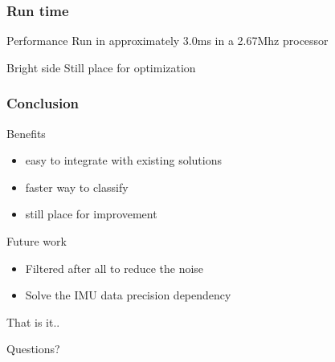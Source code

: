 \documentclass{beamer}
\begin{document}
	\begin{frame}
		\frametitle{Run time}

		\begin{alertblock}{Performance}
			Run in approximately 3.0ms in a 2.67Mhz processor
		\end{alertblock}		
		
		\begin{exampleblock}{Bright side}
			Still place for optimization
		\end{exampleblock}				
		
	\end{frame}	

	\begin{frame}
		\frametitle{Conclusion}
		
		\begin{block}{Benefits}
			\begin{itemize}
			\item easy to integrate with existing solutions
			\item faster way to classify
			\item still place for improvement
			\end{itemize}
		\end{block}		
		
		\begin{block}{Future work}
			\begin{itemize}
			\item Filtered after all to reduce the noise
			\item Solve the IMU data precision dependency
			\end{itemize}
		\end{block}
		
	\end{frame}

%			
%
%

	\begin{frame}{That is it..}
	\begin{alertblock}{}
		\center
		Questions?
	\end{alertblock}
	\end{frame} 	
 	


{} 	
\end{document}
